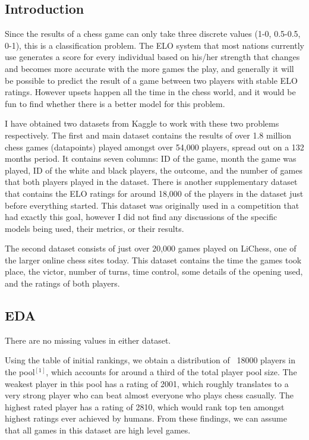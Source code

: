 \documentclass[12pt, letterpaper]{article}
\begin{document}
\begin{multicols}{2}
\subsection*{Introduction}

Since the results of a chess game can only take three discrete values (1-0, 0.5-0.5, 0-1), this is a classification problem. The ELO system that most nations currently use generates a score for every individual based on his/her strength that changes and becomes more accurate with the more games the play, and generally it will be possible to predict the result of a game between two players with stable ELO ratings. However upsets happen all the time in the chess world, and it would be fun to find whether there is a better model for this problem.

I have obtained two datasets from Kaggle to work with these two problems respectively. The first and main dataset contains the results of over 1.8 million chess games (datapoints) played amongst over 54,000 players, spread out on a 132 months period. It contains seven columns: ID of the game, month the game was played, ID of the white and black players, the outcome, and the number of games that both players played in the dataset. There is another supplementary dataset that contains the ELO ratings for around 18,000 of the players in the dataset just before everything started. This dataset was originally used in a competition that had exactly this goal, however I did not find any discussions of the specific models being used, their metrics, or their results.

The second dataset consists of just over 20,000 games played on LiChess, one of the larger online chess sites today. This dataset contains the time the games took place, the victor, number of turns, time control, some details of the opening used, and the ratings of both players.

\subsection*{EDA}

There are no missing values in either dataset. 

Using the table of initial rankings, we obtain a distribution of ~18000 players in the pool$^{[1]}$, which accounts for around a third of the total player pool size. The weakest player in this pool has a rating of 2001, which roughly translates to a very strong player who can beat almost everyone who plays chess casually. The highest rated player has a rating of 2810, which would rank top ten amongst highest ratings ever achieved by humans. From these findings, we can assume that all games in this dataset are high level games.


\end{multicols}
\end{document}
